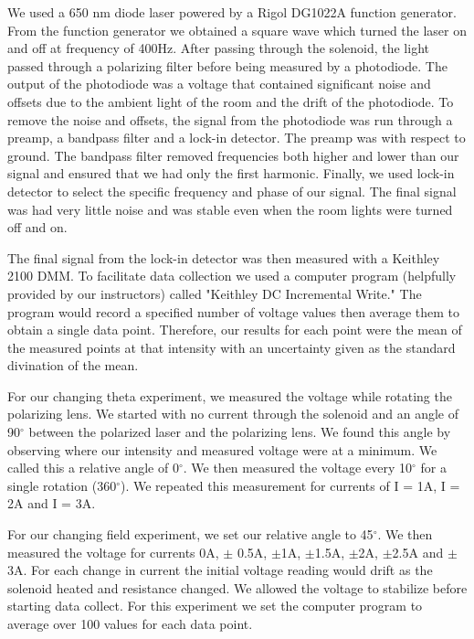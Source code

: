\documentclass[prb,preprint]{revtex4-1}
\begin{document}
We used a 650 nm diode laser powered by a Rigol DG1022A function generator. From the function generator we obtained a square wave which turned the laser on and off at frequency of 400Hz. After passing through the solenoid, the light passed through a polarizing filter before being measured by a photodiode. The output of the photodiode was a voltage that contained significant noise and offsets due to the ambient light of the room and the drift of the photodiode.  To remove the noise and offsets, the signal from the photodiode was run through a preamp, a bandpass filter and a lock-in detector. The preamp was with respect to ground. The bandpass filter removed frequencies both higher and lower than our signal and ensured that we had only the first harmonic. Finally, we used lock-in detector to select the specific frequency and phase of our signal. The final signal was had very little noise and was stable even when the room lights were turned off and on.

The final signal from the lock-in detector was then measured with a Keithley 2100 DMM. To facilitate data collection we used a computer program (helpfully provided by our instructors) called "Keithley DC Incremental Write." The program would record a specified number of voltage values then average them to obtain a single data point. Therefore, our results for each point were the mean of the measured points at that intensity with an uncertainty given as the standard divination of the mean. 

For our changing theta experiment, we measured the voltage while rotating the polarizing lens. We started with no current through the solenoid and an angle of 90$^{\circ}$ between the polarized laser and the polarizing lens. We found this angle by observing where our intensity and measured voltage were at a minimum. We called this a relative angle of 0$^{\circ}$. We then measured the voltage every 10$^{\circ}$ for a single rotation (360$^{\circ}$). We repeated this measurement for currents of I = 1A, I = 2A and I = 3A.

For our changing field experiment, we set our relative angle to 45$^{\circ}$. We then measured the voltage for currents 0A, $\pm$ 0.5A, $\pm$1A, $\pm$1.5A, $\pm$2A, $\pm$2.5A and $\pm$3A. For each change in current the initial voltage reading would drift as the solenoid heated and resistance changed. We allowed the voltage to stabilize before starting data collect. For this experiment we set the computer program to average over 100 values for each data point.
\end{document}
